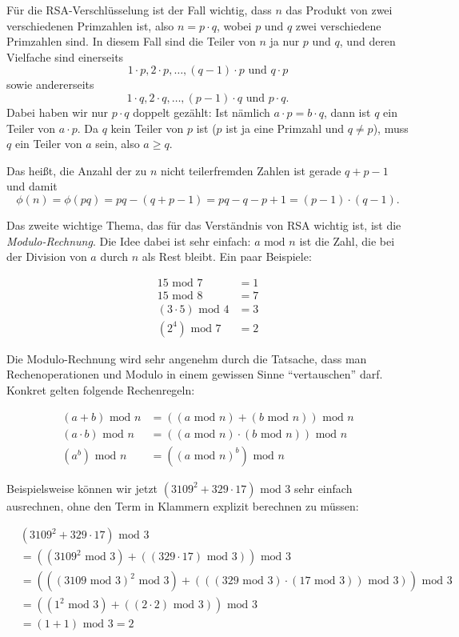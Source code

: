 \documentclass{zusammenfassung}
\begin{document}
Für die RSA-Verschlüsselung ist der Fall wichtig, dass $n$ das Produkt von zwei verschiedenen Primzahlen ist, also $n=p\cdot q$,
wobei $p$ und $q$ zwei verschiedene Primzahlen sind. In diesem Fall sind die Teiler von $n$ ja nur $p$ und $q$, und deren
Vielfache sind einerseits
\[
	1\cdot p, 2\cdot p, \ldots, (q-1)\cdot p\text{ und }q\cdot p
\]
sowie andererseits
\[
  1\cdot q, 2\cdot q, \ldots, (p-1)\cdot q\text{ und }p\cdot q.
\]
Dabei haben wir nur $p\cdot q$ doppelt gezählt: Ist nämlich $a\cdot p=b\cdot q$, dann ist $q$ ein Teiler von $a\cdot p$. Da $q$
kein Teiler von $p$ ist ($p$ ist ja eine Primzahl und $q\neq p$), muss $q$ ein Teiler von $a$ sein, also $a\geq q$.

Das heißt, die Anzahl der zu $n$ nicht teilerfremden Zahlen ist gerade $q+p-1$ und damit
\[
	\phi(n)=\phi(pq)=pq-(q+p-1)=pq-q-p+1=(p-1)\cdot(q-1).
\]

\renewcommand{\mod}{\text{ mod }}
Das zweite wichtige Thema, das für das Verständnis von RSA wichtig ist, ist die \emph{Modulo-Rechnung}. Die Idee dabei ist sehr
einfach: $a\mod n$ ist die Zahl, die bei der Division von $a$ durch $n$ als Rest bleibt. Ein paar Beispiele:

\begin{align*}
	15\mod 7&=1\\
	15\mod 8&=7\\
	(3\cdot 5)\mod 4&=3\\
	(2^4)\mod 7&=2
\end{align*}

Die Modulo-Rechnung wird sehr angenehm durch die Tatsache, dass man Rechenoperationen und Modulo in einem gewissen Sinne
"`vertauschen"' darf. Konkret gelten folgende Rechenregeln:

\begin{align*}
	(a+b)\mod n&=((a\mod n)+(b\mod n))\mod n\\
	(a\cdot b)\mod n&=((a\mod n)\cdot(b\mod n))\mod n\\
	(a^b)\mod n&=((a\mod n)^b)\mod n
\end{align*}

Beispielsweise können wir jetzt $(3109^2+329\cdot 17)\mod 3$ sehr einfach ausrechnen, ohne den Term in Klammern explizit berechnen
zu müssen:

\begin{align*}
	&(3109^2+329\cdot 17)\mod 3\\
	&=((3109^2\mod 3)+((329\cdot 17)\mod 3))\mod 3\\
  &=(((3109\mod 3)^2\mod 3)+(((329\mod 3)\cdot(17\mod 3))\mod 3))\mod 3\\
	 &=((1^2\mod 3)+((2\cdot 2)\mod 3))\mod 3\\
	 &=(1+1)\mod 3=2
\end{align*}
\end{document}
